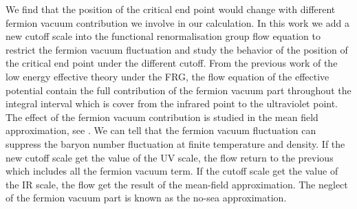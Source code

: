 \documentclass[%
reprint,
superscriptaddress,
showpacs,preprintnumbers,
 amsmath,amssymb,
 aps,
prl,
]{revtex4-1}
\begin{document}
\par We find that the position of the critical end point would change with different fermion vacuum contribution we involve in our calculation. In this work we add a new cutoff scale into the functional renormalisation group flow equation to restrict the fermion vacuum fluctuation and study the behavior of the position of the critical end point under the different cutoff. From the previous work of the low energy effective theory under the FRG, the flow equation of the effective potential contain the full contribution of the fermion vacuum part throughout the integral interval which is cover from the infrared point to the ultraviolet point. The effect of the fermion vacuum contribution is studied in the mean field approximation, see \cite{Skokov:2010sf}. We can tell that the fermion vacuum fluctuation can suppress the baryon number fluctuation at finite temperature and density. If the new cutoff scale get the value of the UV scale, the flow return to the previous which includes all the fermion vacuum term. If the cutoff scale get the value of the IR scale, the flow get the result of the mean-field approximation. The neglect of the fermion vacuum part is known as the no-sea approximation.
\end{document}

